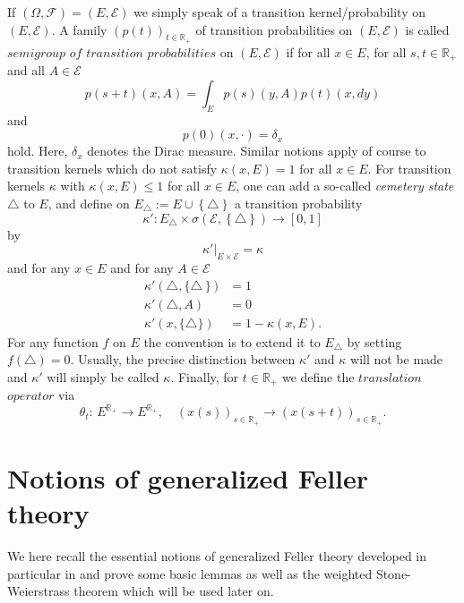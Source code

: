 \documentclass[a4paper,12pt]{article}
\theoremstyle{definition}
\theoremstyle{remark}
\numberwithin{equation}{section}
\numberwithin{theorem}{section}
\begin{document}
If $\left(\Omega,\mathcal{F}\right)=\left(E,\mathcal{\mathcal{E}}\right)$ we simply speak of a transition kernel/probability on $\left(E,\mathcal{\mathcal{E}}\right)$. A family $\left(p(t)\right)_{t\in\mathbb{R}_{+}}$ of transition  probabilities on $\left(E,\mathcal{E}\right)$ is called $\mathit{semigroup}$ $\mathit{of}$ $\mathit{transition}$ $\mathit{probabilities}$  on $ \left(E,\mathcal{E}\right)$ if for all $ x\in E$, for all $s,t\in\mathbb{R}_{+}$ and all $A\in\mathcal{E}$
\[
p(s+t)(x,A)=\int_{E}p(s)(y,A)p(t)(x,dy)
\]
and
\[
p(0)(x,\cdot)=\delta_{x}
\]
hold. Here, $\delta_{x}$ denotes the Dirac measure. Similar notions apply of course to transition kernels which do not satisfy $\kappa(x, E) =1$ for all $x \in E$.  For transition kernels $\kappa$ with  $\kappa(x,E)\leq1$ for all $x\in E$, one can add a so-called \emph{cemetery state} $ \triangle $ to  $E$,
and define on $E_{\triangle}:=E\cup\left\{ \triangle\right\} $  a
transition probability
\[
\kappa':E_{\triangle}\times\sigma\left(\mathcal{\mathcal{\mathcal{E}}},\left\{ \triangle\right\} \right)\rightarrow\left[0,1\right]
\]
by
\[
\left.\kappa'\right|_{E\times\mathcal{\mathcal{E}}}=\kappa
\]
and  for any $x\in E$ and for any $A\in\mathcal E$
\begin{align*}
\kappa'\left( \triangle  ,\{ \triangle\right\}) &=1\\
\kappa'\left( \triangle ,A\right) & =0  \\
\kappa'\left(x,\{ \triangle\} \right) & =1-\kappa(x,E) .
\end{align*}
For any function $f$ on $E$ the convention
is to extend it to $E_{\triangle}$ by setting $f(\triangle)=0$.
Usually, the precise distinction between $\kappa'$ and $\kappa$
will not be made and $\kappa'$ will simply be called $\kappa$.
Finally, for  $t\in\mathbb{R}_{+}$ we define the $\mathit{translation}$ $\mathit{operator}$  via
 \[ 
\theta_{t}:\,E^{\mathbb{\mathbb{R}}_{+}}\rightarrow E^{\mathbb{\mathbb{R}}_{+}}, \quad
 \left(x(s)\right)_{s\in\mathbb{\mathbb{R}}_{+}}\rightarrow\left(x(s+t)\right)_{s\in\mathbb{\mathbb{R}}_{+}}.
 \]

\section{Notions of generalized Feller theory}\label{notionsgenFeller}

We here recall the essential notions of generalized Feller theory developed in particular in \cite{DoT} and prove some basic lemmas as well as the weighted Stone-Weierstrass theorem which will be used later on.
\end{document}
